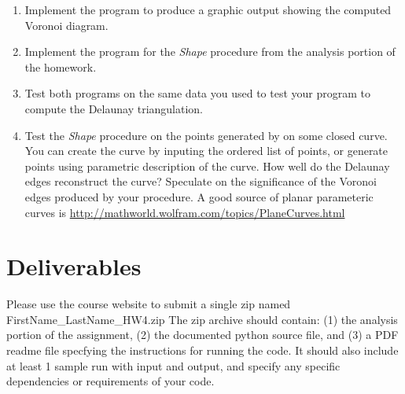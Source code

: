 \documentclass[11pt]{article}
\begin{document}
\begin{enumerate}
\begin{enumerate}
\item 
Implement the program to produce a graphic output showing the computed Voronoi diagram.

\item 
Implement the program for the \emph{Shape} procedure from the analysis portion 
of the homework.

\item
Test both programs on the same data you used to test your program to
compute the Delaunay triangulation.

\item 
Test the \emph{Shape} procedure on the points generated by on some closed curve.
You can create the curve by inputing the ordered list of points,  or generate 
points using parametric description of the curve.  How well do the Delaunay edges 
reconstruct the curve?   Speculate on the significance of the Voronoi edges 
produced by your procedure. 
A good source of planar parameteric curves is 
\href{http://mathworld.wolfram.com/topics/PlaneCurves.html}{http://mathworld.wolfram.com/topics/PlaneCurves.html}


\end{enumerate}


\end{enumerate}




\section*{Deliverables}

Please use the course website to submit a single  zip  named   FirstName\_LastName\_HW4.zip
The zip archive should contain:  (1) the analysis portion of the assignment,  (2)  the documented python source file, and (3) a PDF readme file  specfying the instructions for running the code.  It should also include at least 1 sample run with input and output,  and specify any specific dependencies or requirements of your code.  
\end{document}
